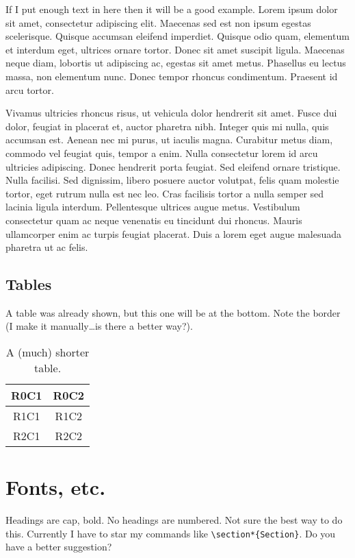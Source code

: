 \documentclass[]{asc}
\begin{document}
If I put enough text in here then it will be a good example.
Lorem ipsum dolor sit amet, consectetur adipiscing elit.
Maecenas sed est non ipsum egestas scelerisque.
Quisque accumsan eleifend imperdiet.
Quisque odio quam, elementum et interdum eget, ultrices ornare tortor.
Donec sit amet suscipit ligula.
Maecenas neque diam, lobortis ut adipiscing ac, egestas sit amet metus.
Phasellus eu lectus massa, non elementum nunc.
Donec tempor rhoncus condimentum.
Praesent id arcu tortor.

Vivamus ultricies rhoncus risus, ut vehicula dolor hendrerit sit amet.
Fusce dui dolor, feugiat in placerat et, auctor pharetra nibh.
Integer quis mi nulla, quis accumsan est.
Aenean nec mi purus, ut iaculis magna.
Curabitur metus diam, commodo vel feugiat quis, tempor a enim.
Nulla consectetur lorem id arcu ultricies adipiscing.
Donec hendrerit porta feugiat.
Sed eleifend ornare tristique.
Nulla facilisi.
Sed dignissim, libero posuere auctor volutpat, felis quam molestie tortor, eget rutrum nulla est nec leo.
Cras facilisis tortor a nulla semper sed lacinia ligula interdum.
Pellentesque ultrices augue metus.
Vestibulum consectetur quam ac neque venenatis eu tincidunt dui rhoncus.
Mauris ullamcorper enim ac turpis feugiat placerat.
Duis a lorem eget augue malesuada pharetra ut ac felis.

\subsection*{Tables}

A table was already shown, but this one will be at the bottom.
Note the border (I make it manually\dots is there a better way?).
\begin{table}[b]
    \centering
    \caption{A (much) shorter table.}
    \begin{tabular}{|c|c|}
        \hline
        R0C1 & R0C2 \\
        \hline \hline
        R1C1 & R1C2 \\
        R2C1 & R2C2 \\
        \hline
    \end{tabular}
    \label{tab:short}
\end{table}


\section*{Fonts, etc.}

Headings are cap, bold.
No headings are numbered.
Not sure the best way to do this.
Currently I have to star my commands like \verb|\section*{Section}|.
Do you have a better suggestion?
\end{document}
